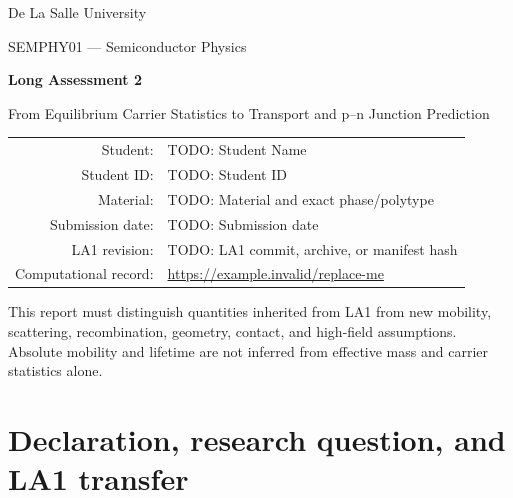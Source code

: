 \documentclass[11pt,a4paper]{article}
\newcommand{\studentname}{TODO: Student Name}
\newcommand{\studentid}{TODO: Student ID}
\newcommand{\materialname}{TODO: Material and exact phase/polytype}
\newcommand{\submissiondate}{TODO: Submission date}
\newcommand{\repositoryurl}{https://example.invalid/replace-me}
\newcommand{\laonerevision}{TODO: LA1 commit, archive, or manifest hash}
\begin{document}
\begin{titlepage}
\centering
{\Large De La Salle University\par}
\vspace{8mm}
{\large SEMPHY01 --- Semiconductor Physics\par}
\vspace{18mm}
{\Huge\bfseries Long Assessment 2\par}
\vspace{4mm}
{\LARGE From Equilibrium Carrier Statistics to Transport and p--n Junction Prediction\par}
\vspace{18mm}
\begin{tabular}{@{}rl@{}}
Student: & \studentname\\
Student ID: & \studentid\\
Material: & \materialname\\
Submission date: & \submissiondate\\
LA1 revision: & \laonerevision\\
Computational record: & \url{\repositoryurl}
\end{tabular}
\vfill
\begin{minipage}{0.88\textwidth}\small
This report must distinguish quantities inherited from LA1 from new mobility,
scattering, recombination, geometry, contact, and high-field assumptions.
Absolute mobility and lifetime are not inferred from effective mass and carrier
statistics alone.
\end{minipage}
\end{titlepage}

\tableofcontents
\clearpage

\section{Declaration, research question, and LA1 transfer}
\end{document}
